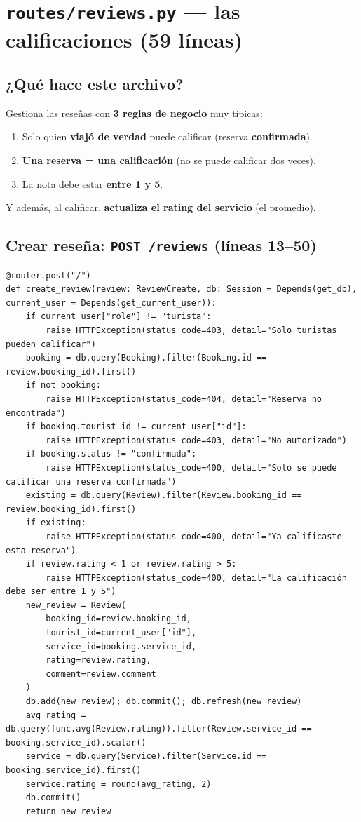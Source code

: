 \documentclass[11pt,a4paper]{article}
\begin{document}
\section{\texttt{routes/reviews.py} --- las calificaciones (59 líneas)}

\subsection{¿Qué hace este archivo?}

Gestiona las reseñas con \textbf{3 reglas de negocio} muy típicas:
\begin{enumerate}
    \item Solo quien \textbf{viajó de verdad} puede calificar (reserva \textbf{confirmada}).
    \item \textbf{Una reserva = una calificación} (no se puede calificar dos veces).
    \item La nota debe estar \textbf{entre 1 y 5}.
\end{enumerate}
Y además, al calificar, \textbf{actualiza el rating del servicio} (el promedio).

\subsection{Crear reseña: \texttt{POST /reviews} (líneas 13--50)}

\begin{lstlisting}
@router.post("/")
def create_review(review: ReviewCreate, db: Session = Depends(get_db), current_user = Depends(get_current_user)):
    if current_user["role"] != "turista":
        raise HTTPException(status_code=403, detail="Solo turistas pueden calificar")
    booking = db.query(Booking).filter(Booking.id == review.booking_id).first()
    if not booking:
        raise HTTPException(status_code=404, detail="Reserva no encontrada")
    if booking.tourist_id != current_user["id"]:
        raise HTTPException(status_code=403, detail="No autorizado")
    if booking.status != "confirmada":
        raise HTTPException(status_code=400, detail="Solo se puede calificar una reserva confirmada")
    existing = db.query(Review).filter(Review.booking_id == review.booking_id).first()
    if existing:
        raise HTTPException(status_code=400, detail="Ya calificaste esta reserva")
    if review.rating < 1 or review.rating > 5:
        raise HTTPException(status_code=400, detail="La calificación debe ser entre 1 y 5")
    new_review = Review(
        booking_id=review.booking_id,
        tourist_id=current_user["id"],
        service_id=booking.service_id,
        rating=review.rating,
        comment=review.comment
    )
    db.add(new_review); db.commit(); db.refresh(new_review)
    avg_rating = db.query(func.avg(Review.rating)).filter(Review.service_id == booking.service_id).scalar()
    service = db.query(Service).filter(Service.id == booking.service_id).first()
    service.rating = round(avg_rating, 2)
    db.commit()
    return new_review
\end{lstlisting}
\end{document}
